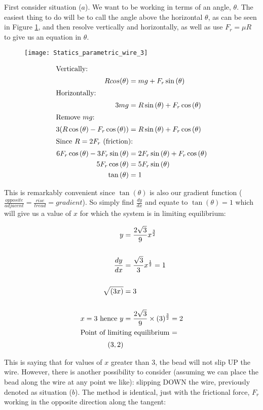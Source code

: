 \begin{problem}[A1989MsQ6l]
{{First consider situation ($a$). We want to be working in terms of an angle, $\theta$. The easiest thing to do will be to call the angle above the horizontal $\theta$, as can be seen in Figure \ref{fig:Statics_parametric_wire_3}, and then resolve vertically and horizontally, as well as use $F_r = \mu R$ to give us an equation in $\theta$. 

 \begin{figure}[h]
	\centering
	\texttt{[image: Statics\_parametric\_wire\_3]}
	\caption{}	
	\label{fig:Statics_parametric_wire_3}
\end{figure}

\begin{align*} \intertext{Vertically:} Rcos{(\theta)} &= mg + F_r\sin{(\theta)} \\
\intertext{Horizontally:} 3mg&=R\sin{(\theta)} +F_r\cos{(\theta)} \\
\intertext{Remove $mg$:} 3(R\cos{(\theta)} - F_r\cos{(\theta)}) &= R\sin{(\theta)} + F_r\cos{(\theta)} \\
\intertext{Since $R = 2 F_r$ (friction):} 6F_r\cos{(\theta)} - 3F_r\sin{(\theta)} &= 2F_r \sin{(\theta)} +F_r \cos{(\theta)} \\
5F_r\cos{(\theta)} &= 5F_r\sin{(\theta)} \\
\tan{(\theta)} &= 1 \end{align*}

This is remarkably convenient since $\tan{(\theta)}$ is also our gradient function ($\frac{opposite}{adjacent} = \frac{rise}{tread} = gradient$). So simply find $\frac{dy}{dx}$ and equate to $\tan{(\theta)} = 1$ which will give us a value of $x$ for which the system is in limiting equilibrium:

\begin{align*}y &= \frac{2\sqrt{3}}{9}x^{\frac{3}{2}} \\
\\ \frac{dy}{dx} &= \frac{\sqrt{3}}{3}x^{\frac{1}{2}} = 1 \\
\\ \sqrt{(3x)} &= 3 \\
\\x = 3 \textrm{ hence } y &= \frac{2\sqrt{3}}{9}\times (3)^{\frac{3}{2}} = 2 \\
\intertext{Point of limiting equilibrium =} (3,2) \end{align*}

This is saying that for values of $x$ greater than $3$, the bead will not slip UP the wire. However, there is another possibility to consider (assuming we can place the bead along the wire at any point we like): slipping DOWN the wire, previously denoted as situation ($b$). The method is identical, just with the frictional force, $F_r$ working in the opposite direction along the tangent:

}}
\end{problem}
